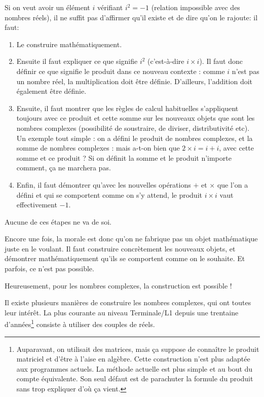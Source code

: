 Si on veut avoir un élément $i$ vérifiant $i^2=-1$ (relation impossible avec des nombres réels), il ne suffit pas d'affirmer qu'il existe et de dire qu'on le rajoute: il faut:
\begin{enumerate}
\item Le construire mathématiquement.
\item Ensuite il faut expliquer ce que signifie $i^2$ (c'est-à-dire $i\times i$). Il faut donc définir ce que signifie le produit dans ce nouveau contexte : comme $i$ n'est pas un nombre réel, la multiplication doit être définie. D'ailleurs, l'addition doit également être définie.
\item Ensuite, il faut montrer que les règles de calcul habituelles s'appliquent toujours avec ce produit et cette  somme sur les nouveaux objets que sont les nombres complexes (possibilité de soustraire, de diviser, distributivité etc). Un exemple tout simple : on a défini le produit de nombres complexes, et la somme de nombres complexes : mais a-t-on bien que $2\times i = i+i$, avec cette somme et ce produit ? Si on définit la somme et le produit n'importe comment, ça ne marchera pas.
\item Enfin, il faut démontrer qu'avec les nouvelles opérations $+$ et $\times$ que l'on a défini et qui se comportent comme on s'y attend, le produit $i\times i$ vaut effectivement $-1$.
\end{enumerate}    

Aucune de ces étapes ne va de soi.


\begin{mdframed}
Encore une fois, la morale est donc qu'on ne fabrique pas un objet mathématique juste en le voulant. Il faut construire concrètement les nouveaux objets, et démontrer mathématiquement qu'ils se comportent comme on le souhaite. Et parfois, ce n'est pas possible.

Heureusement, pour les nombres complexes, la construction est possible !
\end{mdframed}


Il existe plusieurs manières de construire les nombres complexes, qui ont toutes leur intérêt. La plus courante au niveau Terminale/L1 depuis une trentaine d'années\footnote{Auparavant, on utilisait des matrices, mais ça suppose de connaître le produit matriciel et d'être à l'aise en algèbre. Cette construction n'est plus adaptée aux programmes actuels. La méthode actuelle est plus simple et au bout du compte équivalente. Son seul défaut est de \og parachuter\fg{} la formule du produit sans trop expliquer d'où ça vient.} consiste à utiliser des couples de réels.

